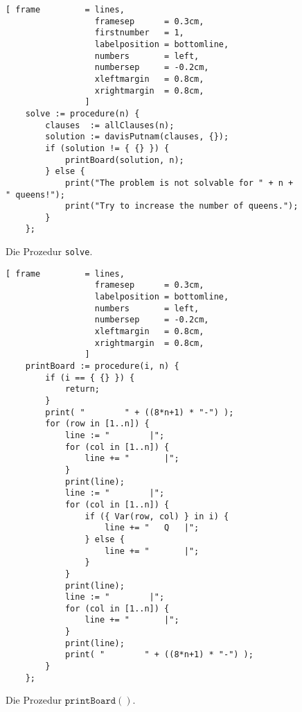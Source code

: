 \begin{figure}[!ht]
\centering
\begin{Verbatim}[ frame         = lines, 
                  framesep      = 0.3cm, 
                  firstnumber   = 1,
                  labelposition = bottomline,
                  numbers       = left,
                  numbersep     = -0.2cm,
                  xleftmargin   = 0.8cm,
                  xrightmargin  = 0.8cm,
                ]
    solve := procedure(n) {
        clauses  := allClauses(n);
        solution := davisPutnam(clauses, {});
        if (solution != { {} }) {
            printBoard(solution, n);
        } else {
            print("The problem is not solvable for " + n + " queens!");
            print("Try to increase the number of queens.");
        }
    };
\end{Verbatim}
\vspace*{-0.3cm}
\caption{Die Prozedur \texttt{solve}.}
\label{fig:davisPutnam:solve}
\end{figure}


\begin{figure}[!ht]
\centering
\begin{Verbatim}[ frame         = lines, 
                  framesep      = 0.3cm, 
                  labelposition = bottomline,
                  numbers       = left,
                  numbersep     = -0.2cm,
                  xleftmargin   = 0.8cm,
                  xrightmargin  = 0.8cm,
                ]
    printBoard := procedure(i, n) {
        if (i == { {} }) {
            return;
        }
        print( "        " + ((8*n+1) * "-") );
        for (row in [1..n]) {
            line := "        |";
            for (col in [1..n]) {
                line += "       |";
            }
            print(line);
            line := "        |";
            for (col in [1..n]) {
                if ({ Var(row, col) } in i) {
                    line += "   Q   |";
                } else {
                    line += "       |";
                }
            }
            print(line);
            line := "        |";
            for (col in [1..n]) {
                line += "       |";
            }
            print(line);
            print( "        " + ((8*n+1) * "-") );
        }
    };
\end{Verbatim}
\vspace*{-0.3cm}
\caption{Die Prozedur $\texttt{printBoard}()$.}
\label{fig:printBoard}
\end{figure}



